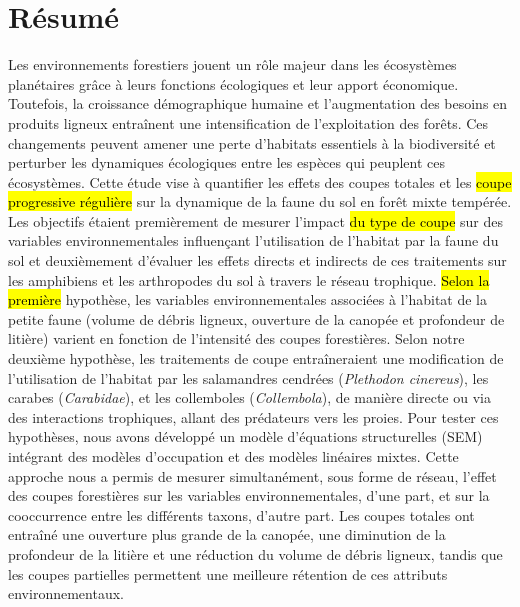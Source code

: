 \chapter*{Résumé}               %
\label{chap-resume}             %

Les environnements forestiers jouent un rôle majeur dans les écosystèmes planétaires grâce à leurs fonctions écologiques et leur apport économique. 
Toutefois, la croissance démographique humaine et l’augmentation des besoins en produits ligneux entraînent une intensification de l'exploitation des forêts. 
Ces changements peuvent amener une perte d'habitats essentiels à la biodiversité et perturber les dynamiques écologiques entre les espèces qui peuplent ces écosystèmes. 
Cette étude vise à quantifier les effets des coupes totales et les \hl{coupe progressive régulière} sur la dynamique de la faune du sol en forêt mixte tempérée. 
Les objectifs étaient premièrement de mesurer l’impact \hl{du type de coupe} sur des variables environnementales influençant l’utilisation de l’habitat par la faune du sol 
et deuxièmement d’évaluer les effets directs et indirects de ces traitements sur les amphibiens et les arthropodes du sol à travers le réseau trophique. 
\hl{Selon la première} hypothèse, les variables environnementales associées à l’habitat de la petite faune (volume de débris ligneux, ouverture de la canopée et profondeur de litière) varient en fonction de l’intensité des coupes forestières. 
Selon notre deuxième hypothèse, les traitements de coupe entraîneraient une modification de l'utilisation de l'habitat 
par les salamandres cendrées (\textit{Plethodon cinereus}), les carabes (\textit{Carabidae}), et les collemboles (\textit{Collembola}), de manière directe ou via des interactions trophiques, 
allant des prédateurs vers les proies. 
Pour tester ces hypothèses, nous avons développé un modèle d’équations structurelles (SEM) intégrant des modèles d’occupation et des modèles linéaires mixtes. 
Cette approche nous a permis de mesurer simultanément, sous forme de réseau, l’effet des coupes forestières sur les variables environnementales, d’une part, et sur la cooccurrence entre les différents taxons, d’autre part. 
Les coupes totales ont entraîné une ouverture plus grande de la canopée, une diminution de la profondeur de la litière et une réduction du volume de débris ligneux, 
tandis que les coupes partielles permettent une meilleure rétention de ces attributs environnementaux. 
